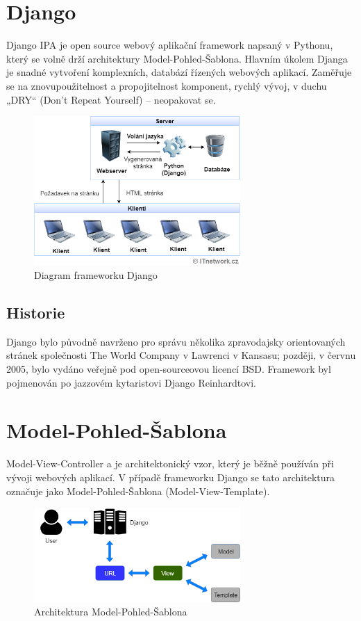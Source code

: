 \documentclass[12pt, a4paper,
twoside,        %
openright
]{report}
\begin{document}
\section{Django}
\label{django}

Django IPA je open source webový aplikační framework napsaný v Pythonu, který se volně drží architektury Model-Pohled-Šablona. Hlavním úkolem Djanga je snadné vytvoření komplexních, databází řízených webových aplikací. Zaměřuje se na znovupoužitelnost a propojitelnost komponent, rychlý vývoj, v duchu „DRY“ (Don’t Repeat Yourself) – neopakovat se.
	\begin{figure}[h!]
		\centering
		\includegraphics[width=0.7\textwidth]{image/django-diagram.png}
		\caption{Diagram frameworku Django}
		\label{fig:djangodiagram}
	\end{figure}

\subsection{Historie}
Django bylo původně navrženo pro správu několika zpravodajsky orientovaných stránek společnosti The World Company v Lawrenci v Kansasu; později, v červnu 2005, bylo vydáno veřejně pod open-sourceovou licencí BSD. Framework byl pojmenován po jazzovém kytaristovi Django Reinhardtovi.

\section{Model-Pohled-Šablona}
\label{modelpohledsablona}

Model-View-Controller a je architektonický vzor, který je běžně používán při vývoji webových aplikací. V případě frameworku Django se tato architektura označuje jako Model-Pohled-Šablona (Model-View-Template).
	\begin{figure}[h!]
		\centering
		\includegraphics[width=0.7\textwidth]{image/django-mvt.png}
		\caption{Architektura Model-Pohled-Šablona}
		\label{fig:mvp}
	\end{figure}
\end{document}
